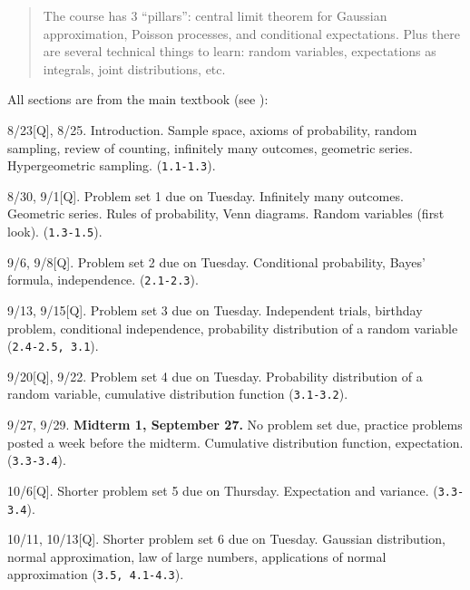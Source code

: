 \documentclass[oneside,11pt]{amsart}
\begin{document}
\begin{quote}
	The course has 3 ``pillars'': central limit theorem for Gaussian approximation, 
	Poisson processes, and conditional expectations. 
	Plus there are several technical things to learn: random variables, expectations as integrals, 
	joint distributions, etc.
\end{quote}

\bigskip

All sections are from the main textbook (see ):
\begin{enumerate}[\bf{}{[}week 1{]}]
	\item 8/23[Q], 8/25.
		Introduction. Sample space, axioms of probability, random sampling, review of counting,
		infinitely many outcomes, geometric series. Hypergeometric sampling.
		(\texttt{1.1-1.3}).
	\item 8/30, 9/1[Q].
		Problem set 1 due on Tuesday.
		Infinitely many outcomes. Geometric series. 
		Rules of probability, Venn diagrams. Random variables (first look). 
		(\texttt{1.3-1.5}).
	\item 9/6, 9/8[Q].
		Problem set 2 due on Tuesday.
		Conditional probability, Bayes' formula, independence.
		(\texttt{2.1-2.3}).
	\item 9/13, 9/15[Q].
		Problem set 3 due on Tuesday.
		Independent trials, birthday problem, conditional independence, 
		probability distribution of a random variable
		(\texttt{2.4-2.5, 3.1}).
	\item 9/20[Q], 9/22.
		Problem set 4 due on Tuesday.
		Probability distribution of a random variable,
		cumulative distribution function (\texttt{3.1-3.2}).
	\item 9/27, 9/29. \textbf{Midterm 1, September 27.}
		No problem set due, practice problems posted a week before the midterm.
		Cumulative distribution function, 
		expectation.
		(\texttt{3.3-3.4}).
	\item 
		10/6[Q].
		Shorter problem set 5 due on Thursday.
		Expectation and variance.
		(\texttt{3.3-3.4}).
	\item 10/11, 10/13[Q].
		Shorter problem set 6 due on Tuesday.
		Gaussian distribution, normal approximation,
		law of large numbers,
		applications of normal approximation
		(\texttt{3.5, 4.1-4.3}).


\end{enumerate}
\end{document}

